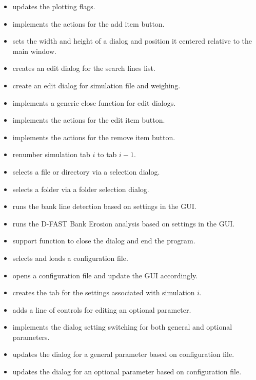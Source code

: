 \begin{itemize}
\item {} updates the plotting flags.
\item {} implements the actions for the add item button.
\item {} sets the width and height of a dialog and position it centered relative to the main window.
\item {} creates an edit dialog for the search lines list.
\item {} create an edit dialog for simulation file and weighing.
\item {} implements a generic close function for edit dialogs.
\item {} implements the actions for the edit item button.
\item {} implements the actions for the remove item button.
\item {} renumber simulation tab $i$ to tab $i-1$.
\item {} selects a file or directory via a selection dialog.
\item {} selects a folder via a folder selection dialog.
\item {} runs the bank line detection based on settings in the GUI.
\item {} runs the D-FAST Bank Erosion analysis based on settings in the GUI.
\item {} support function to close the dialog and end the program.
\item {} selects and loads a configuration file.
\item {} opens a configuration file and update the GUI accordingly.
\item {} creates the tab for the settings associated with simulation $i$.
\item {} adds a line of controls for editing an optional parameter.
\item {} implements the dialog setting switching for both general and optional parameters.
\item {} updates the dialog for a general parameter based on configuration file.
\item {} updates the dialog for an optional parameter based on configuration file.

\end{itemize}
